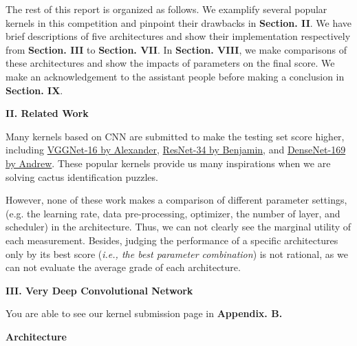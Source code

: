 \documentclass[a4paper]{article}
\begin{document}
{The rest of this report is organized as follows. We examplify several popular kernels in this competition and pinpoint their drawbacks in \textbf{Section. II}. We have brief descriptions of five architectures and show their implementation respectively from \textbf{Section. III} to \textbf{Section. VII}. In \textbf{Section. VIII}, we make comparisons of these architectures and show the impacts of parameters on the final score. We make an acknowledgement to the assistant people before making a conclusion in \textbf{Section. IX}.

}

\vspace{5mm}
\begin{center}
\LARGE\textbf{II. Related Work} \\
\end{center}
\vspace{2mm}

Many kernels based on CNN are submitted to make the testing set score higher, including \href{https://www.kaggle.com/ateplyuk/keras-transfer-vgg16}{\textsf{VGGNet-16} by Alexander}, \href{https://www.kaggle.com/ateplyuk/keras-transfer-densenet121}{\textsf{ResNet-34} by Benjamin}, and \href{https://www.kaggle.com/artgor/detecting-cactus-with-kekas}{\textsf{DenseNet-169} by Andrew}. These popular kernels provide us many inspirations when we are solving cactus identification puzzles.

However, none of these work makes a comparison of different parameter settings, (e.g. the learning rate, data pre-processing, optimizer, the number of layer, and scheduler) in the architecture. Thus, we can not clearly see the marginal utility of each measurement. Besides, judging the performance of a specific architectures only by its best score (\textit{i.e., the best parameter combination}) is not rational, as we can not evaluate the average grade of each architecture. 

\clearpage
\vspace{5mm}
\begin{center}
\LARGE\textbf{III. Very Deep Convolutional Network} \\
\end{center}
\vspace{2mm}

\large{You are able to see our kernel submission page in \textbf{Appendix. B.}}

\vspace{2mm}
\begin{center}
\large\textbf{Architecture} \\
\end{center}
\end{document}
